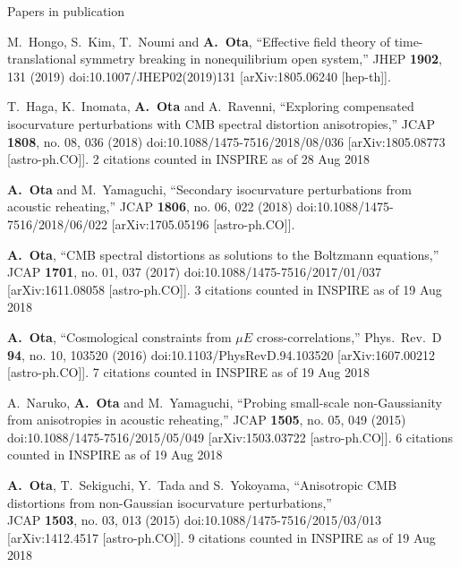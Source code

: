 \documentclass[a4paper]{resume} %
\begin{document}
\begin{rSection}{Papers in publication}
\begin{etaremune}
      \item 
      M.~Hongo, S.~Kim, T.~Noumi and {\bf A.~Ota},
  ``Effective field theory of time-translational symmetry breaking in nonequilibrium open system,''
  JHEP {\bf 1902}, 131 (2019)
  doi:10.1007/JHEP02(2019)131
  [arXiv:1805.06240 [hep-th]].



\item
  T.~Haga, K.~Inomata, {\bf A.~Ota} and A.~Ravenni,
  ``Exploring compensated isocurvature perturbations with CMB spectral distortion anisotropies,''
  JCAP {\bf 1808}, no. 08, 036 (2018)
  doi:10.1088/1475-7516/2018/08/036
  [arXiv:1805.08773 [astro-ph.CO]].
  2 citations counted in INSPIRE as of 28 Aug 2018
  
    \item 
  {\bf A.~Ota} and M.~Yamaguchi,
  ``Secondary isocurvature perturbations from acoustic reheating,''
  JCAP {\bf 1806}, no. 06, 022 (2018)
  doi:10.1088/1475-7516/2018/06/022
  [arXiv:1705.05196 [astro-ph.CO]].
  
    \item
  {\bf A.~Ota},
  ``CMB spectral distortions as solutions to the Boltzmann equations,''
  JCAP {\bf 1701}, no. 01, 037 (2017)
  doi:10.1088/1475-7516/2017/01/037
  [arXiv:1611.08058 [astro-ph.CO]].
  3 citations counted in INSPIRE as of 19 Aug 2018
  
    \item
  {\bf A.~Ota},
  ``Cosmological constraints from $\mu E$ cross-correlations,''
  Phys.\ Rev.\ D {\bf 94}, no. 10, 103520 (2016)
  doi:10.1103/PhysRevD.94.103520
  [arXiv:1607.00212 [astro-ph.CO]].
  7 citations counted in INSPIRE as of 19 Aug 2018

  \item
    A.~Naruko, {\bf A.~Ota} and M.~Yamaguchi,
  ``Probing small-scale non-Gaussianity from anisotropies in acoustic reheating,''
  JCAP {\bf 1505}, no. 05, 049 (2015)
  doi:10.1088/1475-7516/2015/05/049
  [arXiv:1503.03722 [astro-ph.CO]].
  6 citations counted in INSPIRE as of 19 Aug 2018
  
    \item
  {\bf A.~Ota}, T.~Sekiguchi, Y.~Tada and S.~Yokoyama,
  ``Anisotropic CMB distortions from non-Gaussian isocurvature perturbations,''\\
  JCAP {\bf 1503}, no. 03, 013 (2015)
  doi:10.1088/1475-7516/2015/03/013
  [arXiv:1412.4517 [astro-ph.CO]].
  9 citations counted in INSPIRE as of 19 Aug 2018
  

\end{etaremune}
\end{rSection}
\end{document}

